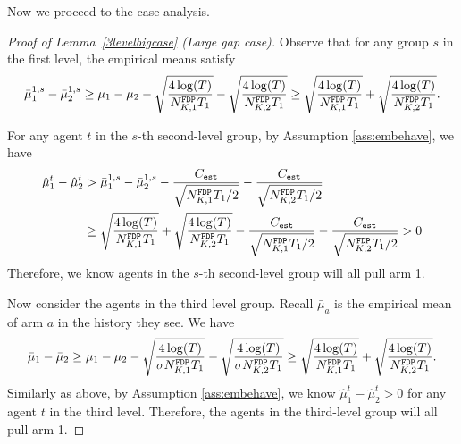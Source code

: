 Now we proceed to the case analysis.


\begin{proof}[Proof of Lemma~\ref{3levelbigcase} (Large gap case)]
  Observe that for any group $s$ in the first level, the empirical
  means satisfy
\[
\bar{\mu}_1^{1,s} - \bar{\mu}_2^{1,s} \geq \mu_1 -\mu_2 - \sqrt{\frac{4\log(T)}{\fdpN[1]T_1}} - \sqrt{\frac{4\log(T)}{\fdpN[2]T_1}} \geq  \sqrt{\frac{4\log(T)}{\fdpN[1]T_1}} + \sqrt{\frac{4\log(T)}{\fdpN[2]T_1}}.
\]


For any agent $t$ in the $s$-th second-level group, by Assumption \ref{ass:embehave}, we have
\begin{align*}
\hat{\mu}_1^t - \hat{\mu}_2^t &>\bar{\mu}_1^{1,s} - \bar{\mu}_2^{1,s} - \frac{\estC}{\sqrt{\fdpN[1]T_1/2}} - \frac{\estC}{\sqrt{\fdpN[2]T_1/2}}\\
&\geq  \sqrt{\frac{4\log(T)}{\fdpN[1]T_1}} + \sqrt{\frac{4\log(T)}{\fdpN[2]T_1}}- \frac{\estC}{\sqrt{\fdpN[1]T_1/2}} - \frac{\estC}{\sqrt{\fdpN[2]T_1/2}} > 0
\end{align*}
Therefore, we know agents in the $s$-th second-level group will all pull arm 1.

Now consider the agents in the third level group. Recall $\bar{\mu}_a$
is the empirical mean of arm $a$ in the history they see. We have
\[
\bar{\mu}_1 - \bar{\mu}_2 \geq \mu_1 -\mu_2 - \sqrt{\frac{4\log(T)}{\NG\fdpN[1]T_1}} - \sqrt{\frac{4\log(T)}{\NG\fdpN[2]T_1}} \geq  \sqrt{\frac{4\log(T)}{\fdpN[1]T_1}}
+ \sqrt{\frac{4\log(T)}{\fdpN[2]T_1}}.
\]
Similarly as above, by Assumption \ref{ass:embehave}, we know
$\hat{\mu}_1^t - \hat{\mu}_2^t > 0$ for any agent $t$ in the third
level. Therefore, the agents in the third-level group will all pull
arm 1.  
\end{proof}


